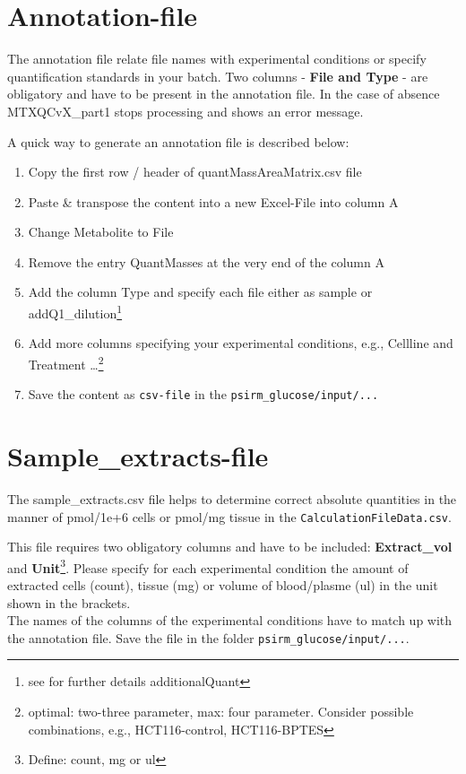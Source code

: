 \documentclass[]{book}
\providecommand{\tightlist}{%
  \setlength{\itemsep}{0pt}\setlength{\parskip}{0pt}}
\let\rmarkdownfootnote\footnote%
\def\footnote{\protect\rmarkdownfootnote}
\theoremstyle{definition}
\theoremstyle{definition}
\theoremstyle{definition}
\theoremstyle{remark}
\begin{document}
\section{Annotation-file}\label{annotation-file}

The annotation file relate file names with experimental conditions or
specify quantification standards in your batch. Two columns -
\textbf{File and Type} - are obligatory and have to be present in the
annotation file. In the case of absence MTXQCvX\_part1 stops processing
and shows an error message.

A quick way to generate an annotation file is described below:

\begin{enumerate}
\def\labelenumi{\arabic{enumi}.}
\tightlist
\item
  Copy the first row / header of quantMassAreaMatrix.csv file
\item
  Paste \& transpose the content into a new Excel-File into column A
\item
  Change Metabolite to File
\item
  Remove the entry QuantMasses at the very end of the column A
\item
  Add the column Type and specify each file either as sample or
  addQ1\_dilution\footnote{see for further details additionalQuant}
\item
  Add more columns specifying your experimental conditions, e.g.,
  Cellline and Treatment \ldots{}\footnote{optimal: two-three parameter,
    max: four parameter. Consider possible combinations, e.g.,
    HCT116-control, HCT116-BPTES}
\item
  Save the content as \texttt{csv-file} in the
  \texttt{psirm\_glucose/input/...}
\end{enumerate}

\section{Sample\_extracts-file}\label{sample_extracts-file}

The sample\_extracts.csv file helps to determine correct absolute
quantities in the manner of pmol/1e+6 cells or pmol/mg tissue in the
\texttt{CalculationFileData.csv}.

This file requires two obligatory columns and have to be included:
\textbf{Extract\_vol} and \textbf{Unit}\footnote{Define: count, mg or ul}.
Please specify for each experimental condition the amount of extracted
cells (count), tissue (mg) or volume of blood/plasme (ul) in the unit
shown in the brackets.\\
The names of the columns of the experimental conditions have to match up
with the annotation file. Save the file in the folder
\texttt{psirm\_glucose/input/...}.
\end{document}
